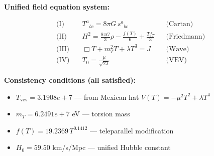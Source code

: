 
\textbf{Unified field equation system:}

\begin{align}
  \text{(I)} \quad & T^a{}_{bc} = 8\pi G \, s^a{}_{bc} && \text{(Cartan)} \\
  \text{(II)} \quad & H^2 = \frac{8\pi G}{3}\rho - \frac{f(T)}{6} + \frac{Tf_T}{3} && \text{(Friedmann)} \\
  \text{(III)} \quad & \Box T + m_T^2 T + \lambda T^3 = J && \text{(Wave)} \\
  \text{(IV)} \quad & T_0 = \frac{\mu}{\sqrt{2\lambda}} && \text{(VEV)}
\end{align}

\textbf{Consistency conditions (all satisfied):}
\begin{itemize}
  \item $T_{\text{vev}} = 3.1908e+7$ — from Mexican hat $V(T) = -\mu^2 T^2 + \lambda T^4$
  \item $m_T = 6.2491e+7$ eV — torsion mass
  \item $f(T) = 19.2369 \, T^{0.1412}$ — teleparallel modification
  \item $H_0 = 59.50$ km/s/Mpc — unified Hubble constant
\end{itemize}